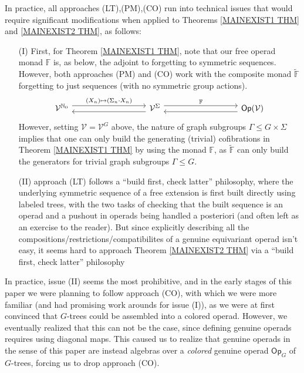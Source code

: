 \documentclass{article}
\begin{document}
In practice, all approaches (LT),(PM),(CO)
run into technical issues 
that would require significant modifications 
when applied to Theorems 
\ref{MAINEXIST1 THM} and \ref{MAINEXIST2 THM},
as follows:
\begin{itemize}
	\item[(I)]
	First, for Theorem
	\ref{MAINEXIST1 THM},
	note that our free operad monad $\mathbb{F}$
	is, as below, the adjoint to forgetting to symmetric sequences.
	However, both approaches
	(PM) and (CO) work with the composite monad 
	$\widetilde{\mathbb{F}}$
	forgetting to just sequences (with no symmetric group actions).
	\begin{equation}
	\begin{tikzcd}[column sep =9em]
	\mathcal{V}^{\mathbb{N}_0}
	\ar[shift left=1.5]{r}
	{(X_n) \mapsto
		(\Sigma_n \cdot X_n)}
	&
	\mathcal{V}^{\Sigma} 
	\arrow[l, shift left=1.5] 
	\arrow[r, shift left=1.5,swap,"\mathbb{F}"']
	&
	\mathsf{Op}(\mathcal{V})
	\ar[shift left=1.5]{l}
	\end{tikzcd}
	\end{equation}
	However, setting $\mathcal{V}=\mathcal{V}^G$ above,
	the nature of graph subgroups $\Gamma \leq G \times \Sigma$ implies that
	one can only build the generating (trivial) cofibrations in 
	Theorem \ref{MAINEXIST1 THM} by using the monad $\mathbb{F}$,
	as $\widetilde{\mathbb{F}}$ can only build the generators for trivial graph subgroups $\Gamma \leq G$.
	\item[(II)] approach (LT) follows a 
	``build first, check latter'' philosophy, 
	where the underlying symmetric sequence of a free extension is first built directly using labeled trees, 
	with the two tasks of checking that the built sequence is
	an operad and a pushout in operads
	being handled a posteriori (and often left as an exercise to the reader). 
	But since explicitly describing all the compositions/restrictions/compatibilites
	of a genuine equivariant operad isn't easy,
	it seems hard to approach 
	Theorem \ref{MAINEXIST2 THM}
	via a ``build first, check latter'' philosophy
\end{itemize}

In practice, issue (II) seems the most prohibitive,
and in the early stages of this paper
we were planning to follow approach (CO),
with which we were more familiar 
(and had promising work arounds for issue (I)), 
as we were at first convinced that $G$-trees
could be assembled into a colored operad.
However, we eventually realized that this can not be the case, since defining genuine operads requires using diagonal maps.
This caused us to realize that genuine operads in the sense of this paper are instead algebras
over a \emph{colored} genuine operad $\mathsf{Op}_G$ of $G$-trees,
forcing us to drop approach (CO).
\end{document}
